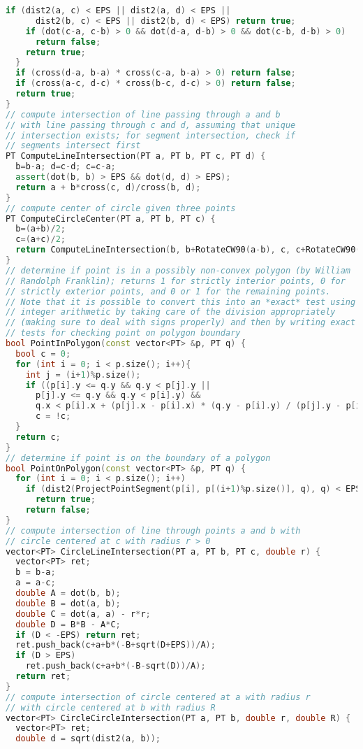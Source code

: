 \begin{lstlisting}[language=C++]
    if (dist2(a, c) < EPS || dist2(a, d) < EPS ||
      dist2(b, c) < EPS || dist2(b, d) < EPS) return true;
    if (dot(c-a, c-b) > 0 && dot(d-a, d-b) > 0 && dot(c-b, d-b) > 0)
      return false;
    return true;
  }
  if (cross(d-a, b-a) * cross(c-a, b-a) > 0) return false;
  if (cross(a-c, d-c) * cross(b-c, d-c) > 0) return false;
  return true;
}
// compute intersection of line passing through a and b
// with line passing through c and d, assuming that unique
// intersection exists; for segment intersection, check if
// segments intersect first
PT ComputeLineIntersection(PT a, PT b, PT c, PT d) {
  b=b-a; d=c-d; c=c-a;
  assert(dot(b, b) > EPS && dot(d, d) > EPS);
  return a + b*cross(c, d)/cross(b, d);
}
// compute center of circle given three points
PT ComputeCircleCenter(PT a, PT b, PT c) {
  b=(a+b)/2;
  c=(a+c)/2;
  return ComputeLineIntersection(b, b+RotateCW90(a-b), c, c+RotateCW90(a-c));
}
// determine if point is in a possibly non-convex polygon (by William
// Randolph Franklin); returns 1 for strictly interior points, 0 for
// strictly exterior points, and 0 or 1 for the remaining points.
// Note that it is possible to convert this into an *exact* test using
// integer arithmetic by taking care of the division appropriately
// (making sure to deal with signs properly) and then by writing exact
// tests for checking point on polygon boundary
bool PointInPolygon(const vector<PT> &p, PT q) {
  bool c = 0;
  for (int i = 0; i < p.size(); i++){
    int j = (i+1)%p.size();
    if ((p[i].y <= q.y && q.y < p[j].y || 
      p[j].y <= q.y && q.y < p[i].y) &&
      q.x < p[i].x + (p[j].x - p[i].x) * (q.y - p[i].y) / (p[j].y - p[i].y))
      c = !c;
  }
  return c;
}
// determine if point is on the boundary of a polygon
bool PointOnPolygon(const vector<PT> &p, PT q) {
  for (int i = 0; i < p.size(); i++)
    if (dist2(ProjectPointSegment(p[i], p[(i+1)%p.size()], q), q) < EPS)
      return true;
    return false;
}
// compute intersection of line through points a and b with
// circle centered at c with radius r > 0
vector<PT> CircleLineIntersection(PT a, PT b, PT c, double r) {
  vector<PT> ret;
  b = b-a;
  a = a-c;
  double A = dot(b, b);
  double B = dot(a, b);
  double C = dot(a, a) - r*r;
  double D = B*B - A*C;
  if (D < -EPS) return ret;
  ret.push_back(c+a+b*(-B+sqrt(D+EPS))/A);
  if (D > EPS)
    ret.push_back(c+a+b*(-B-sqrt(D))/A);
  return ret;
}
// compute intersection of circle centered at a with radius r
// with circle centered at b with radius R
vector<PT> CircleCircleIntersection(PT a, PT b, double r, double R) {
  vector<PT> ret;
  double d = sqrt(dist2(a, b));

\end{lstlisting}
